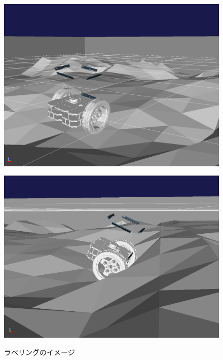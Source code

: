 \documentclass[uplatex,twocolumn, dvipdfmx]{jsarticle}  %
\begin{document}
\begin{figure}[t]
  \centering
  \begin{minipage}[b]{0.47\linewidth}
    \centering
    \includegraphics[keepaspectratio, scale=0.1]{images/safe.png}
    \label{fig:safe}
  \end{minipage}
  \begin{minipage}[b]{0.47\linewidth}
    \centering
    \includegraphics[keepaspectratio, scale=0.096]{images/stack.png}
    \label{fig:stack}
  \end{minipage}
  \caption{ラベリングのイメージ}
\end{figure}
\end{document}
